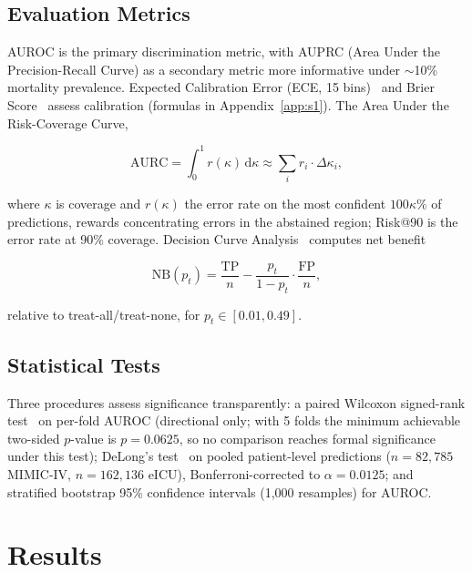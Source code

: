 \documentclass[journal]{IEEEtran}
\begin{document}
	\subsection{Evaluation Metrics}
	\label{sec:metrics}
	
	AUROC is the primary discrimination metric, with AUPRC (Area Under the Precision-Recall Curve) as a secondary metric more informative under $\sim$10\% mortality prevalence. Expected Calibration Error (ECE, 15 bins)~\cite{naeini2015obtaining} and Brier Score~\cite{brier1950verification} assess calibration (formulas in Appendix~\ref{app:s1}). The Area Under the Risk-Coverage Curve,
	
	\begin{equation}
		\text{AURC}
		=\int_0^1 r(\kappa)\,\mathrm{d}\kappa
		\approx
		\sum_i r_i\cdot\Delta\kappa_i,
		\label{eq:aurc}
	\end{equation}
	
	where $\kappa$ is coverage and $r(\kappa)$ the error rate on the most confident $100\kappa\%$ of predictions, rewards concentrating errors in the abstained region; Risk@90 is the error rate at 90\% coverage. Decision Curve Analysis~\cite{vickers2006decision} computes net benefit
	
	\begin{equation}
		\text{NB}(p_t)
		=\frac{\text{TP}}{n}
		-\frac{p_t}{1-p_t}\cdot\frac{\text{FP}}{n},
		\label{eq:net_benefit}
	\end{equation}
	
	relative to treat-all/treat-none, for $p_t\in[0.01,0.49]$.
	\subsection{Statistical Tests}
	\label{sec:statistical_tests}
	
	Three procedures assess significance transparently: a paired Wilcoxon signed-rank test~\cite{wilcoxon1945individual} on per-fold AUROC (directional only; with 5 folds the minimum achievable two-sided $p$-value is $p=0.0625$, so no comparison reaches formal significance under this test); DeLong's test~\cite{delong1988comparing} on pooled patient-level predictions ($n=82,785$ MIMIC-IV, $n=162,136$ eICU), Bonferroni-corrected to $\alpha=0.0125$; and stratified bootstrap 95\% confidence intervals (1,000 resamples) for AUROC.
	
	\section{Results}
	\label{sec:results}
	
\end{document}
